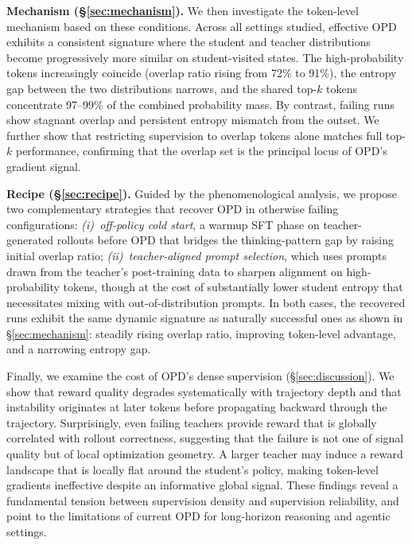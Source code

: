 \textbf{Mechanism (\S\ref{sec:mechanism}).}
We then investigate the token-level mechanism based on these conditions.
Across all settings studied, effective OPD exhibits a consistent signature where the student and teacher distributions become progressively more similar on student-visited states.
The high-probability tokens increasingly coincide (overlap ratio rising from 72\% to 91\%), the entropy gap between the two distributions narrows, and the shared top-$k$ tokens concentrate 97--99\% of the combined probability mass.
By contrast, failing runs show stagnant overlap and persistent entropy mismatch from the outset.
We further show that restricting supervision to overlap tokens alone matches full top-$k$ performance, confirming that the overlap set is the principal locus of OPD's gradient signal.

\textbf{Recipe (\S\ref{sec:recipe}).}
Guided by the phenomenological analysis, we propose two complementary strategies that recover OPD in otherwise failing configurations:
\emph{(i)~off-policy cold start}, a warmup SFT phase on teacher-generated rollouts before OPD that bridges the thinking-pattern gap by raising initial overlap ratio;
\emph{(ii)~teacher-aligned prompt selection}, which uses prompts drawn from the teacher's post-training data to sharpen alignment on high-probability tokens, though at the cost of substantially lower student entropy that necessitates mixing with out-of-distribution prompts.
In both cases, the recovered runs exhibit the same dynamic signature as naturally successful ones as shown in \S\ref{sec:mechanism}: steadily rising overlap ratio, improving token-level advantage, and a narrowing entropy gap.

Finally, we examine the cost of OPD's dense supervision (\S\ref{sec:discussion}).
We show that reward quality degrades systematically with trajectory depth and that instability originates at later tokens before propagating backward through the trajectory.
Surprisingly, even failing teachers provide reward that is globally correlated with rollout correctness, suggesting that the failure is not one of signal quality but of local optimization geometry. A larger teacher may induce a reward landscape that is locally flat around the student's policy, making token-level gradients ineffective despite an informative global signal.
These findings reveal a fundamental tension between supervision density and supervision reliability, and point to the limitations of current OPD for long-horizon reasoning and agentic settings.




















